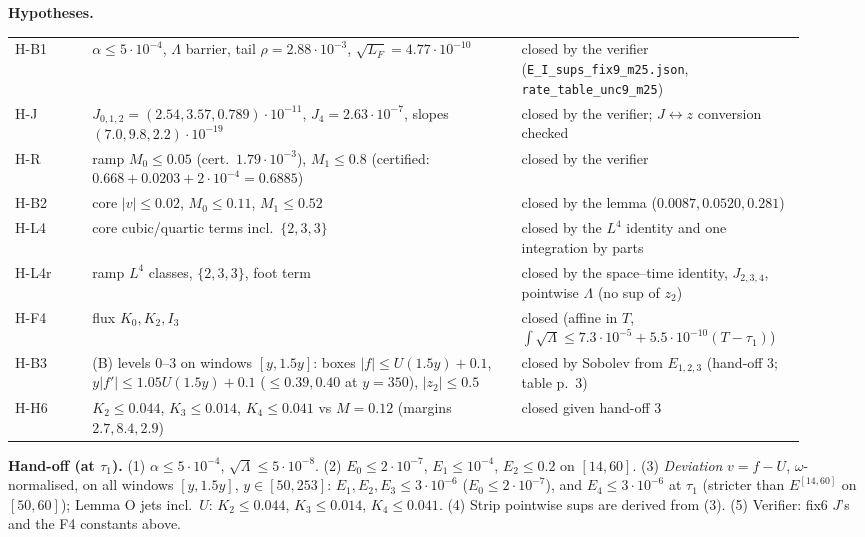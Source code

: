 \documentclass[11pt]{article}
\begin{document}
\noindent\textbf{Hypotheses.}
\begin{center}\begin{tabular}{p{0.09\linewidth}p{0.50\linewidth}p{0.33\linewidth}}
H-B1 & $\alpha\le5\cdot10^{-4}$, $\Lambda$ barrier, tail $\rho=2.88\cdot10^{-3}$, $\sqrt{L_F}=4.77\cdot10^{-10}$ & closed by the verifier (\texttt{E\_I\_sups\_fix9\_m25.json}, \texttt{rate\_table\_unc9\_m25})\\
H-J & $J_{0,1,2}=(2.54,3.57,0.789)\cdot10^{-11}$, $J_4=2.63\cdot10^{-7}$, slopes $(7.0,9.8,2.2)\cdot10^{-19}$ & closed by the verifier; $J\leftrightarrow z$ conversion checked\\
H-R & ramp $M_0\le0.05$ (cert.\ $1.79\cdot10^{-3}$), $M_1\le0.8$ (certified: $0.668+0.0203+2\cdot10^{-4}=0.6885$) & closed by the verifier\\
H-B2 & core $|v|\le0.02$, $M_0\le0.11$, $M_1\le0.52$ & closed by the lemma ($0.0087,0.0520,0.281$)\\
H-L4 & core cubic/quartic terms incl.\ $\{2,3,3\}$ & closed by the $L^4$ identity and one integration by parts\\
H-L4r & ramp $L^4$ classes, $\{2,3,3\}$, foot term & closed by the space--time identity, $J_{2,3,4}$, pointwise $\Lambda$ (no sup of $z_2$)\\
H-F4 & flux $K_0,K_2,I_3$ & closed (affine in $T$, $\int\sqrt\Lambda\le7.3\cdot10^{-5}+5.5\cdot10^{-10}(T-\tau_1)$)\\
H-B3 & (B) levels 0--3 on windows $[y,1.5y]$: boxes $|f|\le U(1.5y)+0.1$, $y|f'|\le1.05U(1.5y)+0.1$ ($\le0.39,0.40$ at $y=350$), $|z_2|\le0.5$ & closed by Sobolev from $E_{1,2,3}$ (hand-off 3; table p.~3)\\
H-H6 & $K_2\le0.044$, $K_3\le0.014$, $K_4\le0.041$ vs $M=0.12$ (margins $2.7,8.4,2.9$) & closed given hand-off 3\\
\end{tabular}\end{center}
\noindent\textbf{Hand-off (at $\tau_1$).} (1) $\alpha\le5\cdot10^{-4}$, $\sqrt\Lambda\le5\cdot10^{-8}$. (2) $E_0\le2\cdot10^{-7}$, $E_1\le10^{-4}$, $E_2\le0.2$ on $[14,60]$. (3) \emph{Deviation} $v=f-U$, $\omega$-normalised, on all windows $[y,1.5y]$, $y\in[50,253]$: $E_1,E_2,E_3\le3\cdot10^{-6}$ ($E_0\le2\cdot10^{-7}$), and $E_4\le3\cdot10^{-6}$ at $\tau_1$ (stricter than $E^{[14,60]}$ on $[50,60]$); Lemma O jets incl.\ $U$: $K_2\le0.044$, $K_3\le0.014$, $K_4\le0.041$. (4) Strip pointwise sups are derived from (3). (5) Verifier: fix6 $J$'s and the F4 constants above.
\end{document}
